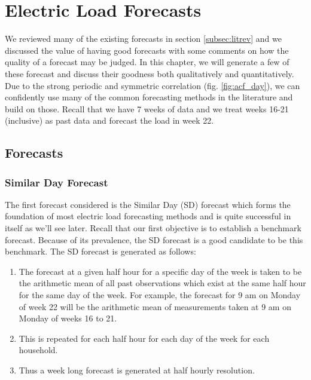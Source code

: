 
\chapter{Electric Load Forecasts}
We reviewed many of the existing forecasts in section \ref{subsec:litrev} and we discussed the value of having good forecasts with some comments on how the quality of a forecast may be judged. In this chapter, we will generate a few of these forecast and discuss their goodness both qualitatively and quantitatively. Due to the strong periodic and symmetric correlation (fig. \ref{fig:acf_day}), we can confidently use many of the common forecasting methods in the literature and build on those. Recall that we have 7 weeks of data and we treat weeks 16-21 (inclusive) as past data and forecast the load in week 22.

\section{Forecasts} \label{subsec:forecasts}

\subsection{Similar Day Forecast}

The first forecast considered is the Similar Day (SD) forecast which forms the foundation of most electric load forecasting methods and is quite successful in itself as we'll see later. Recall that our first objective is to establish a benchmark forecast. Because of its prevalence, the SD forecast is a good candidate to be this benchmark. The SD forecast is generated as follows:
\begin{enumerate}
\item The forecast at a given half hour for a specific day of the week is taken to be the arithmetic mean of all past observations which exist at the same half hour for the same day of the week. For example, the forecast for 9 am on Monday of week 22 will be the arithmetic mean of measurements taken at 9 am on Monday of weeks 16 to 21.
\item This is repeated for each half hour for each day of the week for each household.
\item Thus a week long forecast is generated at half hourly resolution.
\end{enumerate}

